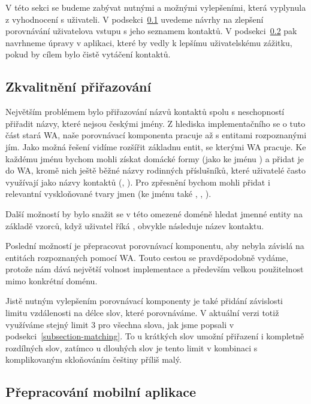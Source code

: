 V této sekci se budeme zabývat nutnými a možnými vylepšeními, která
vyplynula z vyhodnocení s uživateli. V podsekci~\ref{better-match}
uvedeme návrhy na zlepšení porovnávání uživatelova vstupu s jeho
seznamem kontaktů. V podsekci~\ref{better-app} pak navrhneme
úpravy v aplikaci, které by vedly k lepšímu uživatelskému
zážitku, pokud by cílem bylo čistě vytáčení kontaktů.

\subsection{Zkvalitnění přiřazování}\label{better-match}

Největším problémem bylo přiřazování názvů kontaktů spolu s neschopností přiřadit
názvy, které nejsou českými jmény. Z hlediska implementačního se o tuto část
stará WA, naše porovnávací komponenta pracuje až s entitami rozpoznanými jím.
Jako možná řešení vidíme rozšířit základnu entit, se kterými WA pracuje. Ke
každému jménu bychom mohli získat domácké formy (jako  ke jménu )
a přidat je do WA, kromě nich ještě běžné názvy rodinných příslušníků,
které uživatelé často využívají jako názvy kontaktů (, ).
Pro zpřesnění bychom mohli přidat i relevantní vyskloňované tvary jmen (ke jménu 
také , , ).

Další možností by bylo snažit se v této omezené doméně hledat jmenné entity na
základě vzorců, když uživatel říká , obvykle následuje název
kontaktu.

Poslední možností je přepracovat porovnávací komponentu, aby nebyla závislá
na entitách rozpoznaných pomocí WA. Touto cestou se pravděpodobně vydáme,
protože nám dává největší volnost implementace a především velkou
použitelnost mimo konkrétní doménu.

Jistě nutným vylepšením porovnávací komponenty je také přidání závislosti
limitu vzdálenosti na délce slov, které porovnáváme. V aktuální verzi
totiž využíváme stejný limit 3 pro všechna slova, jak jsme popsali
v podsekci~\ref{subsection-matching}. To u krátkých slov umožní
přiřazení i kompletně rozdílných slov, zatímco u dlouhých
slov je tento limit v kombinaci s komplikovaným skloňováním češtiny
příliš malý.

\subsection{Přepracování mobilní aplikace}\label{better-app}

